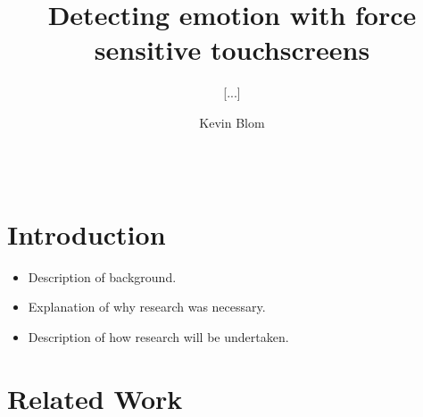 \documentclass{sig-alternate}
\begin{document}
\title{Detecting emotion with force sensitive touchscreens}
\subtitle{[...]}


%
\author{
%
\alignauthor Kevin Blom\\
       \\
       \\
}

\maketitle

\section{Introduction} %
\label{sec:Introduction}

\begin{itemize}
	\item Description of background.
	\item Explanation of why research was necessary.
	\item Description of how research will be undertaken.
\end{itemize}




\section{Related Work} %
\label{sec:Related_Work}
\end{document}
